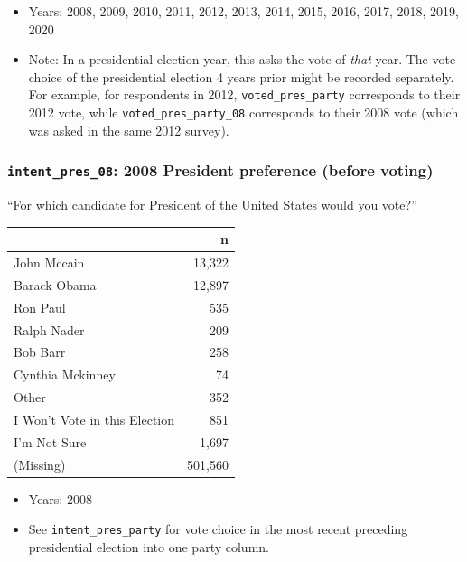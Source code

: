 \documentclass[10pt,article,oneside]{memoir}
\theoremstyle{definition}
\begin{document}
\begin{itemize}
\tightlist
\item
  Years: 2008, 2009, 2010, 2011, 2012, 2013, 2014, 2015, 2016, 2017,
  2018, 2019, 2020
\item
  Note: In a presidential election year, this asks the vote of
  \emph{that} year. The vote choice of the presidential election 4 years
  prior might be recorded separately. For example, for respondents in
  2012, \texttt{voted\_pres\_party} corresponds to their 2012 vote,
  while \texttt{voted\_pres\_party\_08} corresponds to their 2008 vote
  (which was asked in the same 2012 survey).
\end{itemize}

\hypertarget{intent_pres_08-2008-president-preference-before-voting}{%
\subsubsection{\texorpdfstring{\texttt{intent\_pres\_08}: 2008 President
preference (before
voting)}{intent\_pres\_08: 2008 President preference (before voting)}}\label{intent_pres_08-2008-president-preference-before-voting}}

``For which candidate for President of the United States would you
vote?''

\begin{table}[H]
\centering
\begin{tabular}{lr}
\toprule
 & n\\
\midrule
John Mccain & 13,322\\
Barack Obama & 12,897\\
Ron Paul & 535\\
Ralph Nader & 209\\
Bob Barr & 258\\
Cynthia Mckinney & 74\\
Other & 352\\
I Won't Vote in this Election & 851\\
I'm Not Sure & 1,697\\
(Missing) & 501,560\\
\bottomrule
\end{tabular}
\end{table}

\begin{itemize}
\tightlist
\item
  Years: 2008
\item
  See \texttt{intent\_pres\_party} for vote choice in the most recent
  preceding presidential election into one party column.
\end{itemize}
\end{document}
